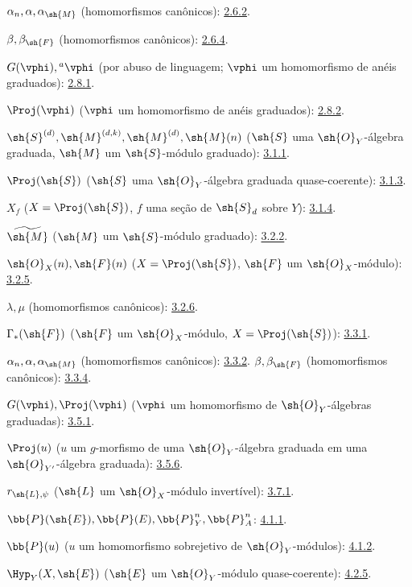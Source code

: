 \documentclass[oneside,10pt]{amsart}
\newcommand{\oldpage}[2][]{\marginnote{\normalfont\footnotesize\textbf{#1}~|~#2}\ignorespaces}
\begin{document}
$\alpha_n,\alpha,\alpha_{\sh{M}}$ (homomorfismos canônicos): \hyperref[II.2.6.2]{2.6.2}.

$\beta,\beta_{\sh{F}}$ (homomorfismos canônicos): \hyperref[II.2.6.4]{2.6.4}.

$G(\vphi),{}^a\vphi$ (por abuso de linguagem;
$\vphi$ um homomorfismo de anéis graduados): \hyperref[II.2.8.1]{2.8.1}.

$\Proj(\vphi)$ ($\vphi$ um homomorfismo de anéis graduados): \hyperref[II.2.8.2]{2.8.2}.

$\sh{S}^{(d)},\sh{M}^{(d,k)},\sh{M}^{(d)},\sh{M}(n)$
($\sh{S}$ uma $\sh{O}_Y$-álgebra graduada,
$\sh{M}$ um $\sh{S}$-módulo graduado): \hyperref[II.3.1.1]{3.1.1}.

$\Proj(\sh{S})$ ($\sh{S}$ uma $\sh{O}_Y$-álgebra graduada quase-coerente): \hyperref[II.3.1.3]{3.1.3}.

$X_f$ ($X=\Proj(\sh{S})$, $f$ uma seção de $\sh{S}_d$ sobre $Y$): \hyperref[II.3.1.4]{3.1.4}.

$\widetilde{\sh{M}}$ ($\sh{M}$ um $\sh{S}$-módulo graduado): \hyperref[II.3.2.2]{3.2.2}.

$\sh{O}_X(n),\sh{F}(n)$
($X=\Proj(\sh{S})$, $\sh{F}$ um $\sh{O}_X$-módulo): \hyperref[II.3.2.5]{3.2.5}.

$\lambda,\mu$ (homomorfismos canônicos): \hyperref[II.3.2.6]{3.2.6}.

$\Gamma_*(\sh{F})$ ($\sh{F}$ um $\sh{O}_X$-módulo,
$X=\Proj(\sh{S})$): \hyperref[II.3.3.1]{3.3.1}.

$\alpha_n,\alpha,\alpha_{\sh{M}}$ (homomorfismos canônicos): \hyperref[II.3.3.2]{3.3.2}.
\oldpage[II]{208}
$\beta,\beta_{\sh{F}}$ (homomorfismos canônicos): \hyperref[II.3.3.4]{3.3.4}.

$G(\vphi),\Proj(\vphi)$
($\vphi$ um homomorfismo de $\sh{O}_Y$-álgebras graduadas): \hyperref[II.3.5.1]{3.5.1}.

$\Proj(u)$ ($u$ um $g$-morfismo de uma $\sh{O}_Y$-álgebra graduada
em uma $\sh{O}_{Y'}$-álgebra graduada): \hyperref[II.3.5.6]{3.5.6}.

$r_{\sh{L},\psi}$ ($\sh{L}$ um $\sh{O}_X$-módulo invertível): \hyperref[II.3.7.1]{3.7.1}.

$\bb{P}(\sh{E}),\bb{P}(E),\bb{P}_Y^n,\bb{P}_A^n$: \hyperref[II.4.1.1]{4.1.1}.

$\bb{P}(u)$ ($u$ um homomorfismo sobrejetivo de $\sh{O}_Y$-módulos): \hyperref[II.4.1.2]{4.1.2}.

$\Hyp_Y(X,\sh{E})$ ($\sh{E}$ um $\sh{O}_Y$-módulo quase-coerente): \hyperref[II.4.2.5]{4.2.5}.
\end{document}
